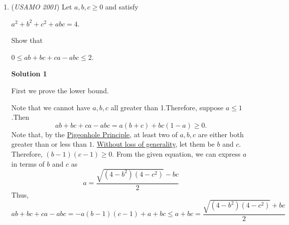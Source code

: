 \begin{enumerate}
 As $Q'$ lies on the incircle and $AD_2$, $Q'=Q$, and our proof is complete.

 


 



\textbf{Solution 4}

We again use Barycentric coordinates. As before, let $A$ be $(1,0,0)$, $B$ be $(0,1,0)$, and $C$ be $(0,0,1)$. Also

 
 \[D_{1}=\left( 0,\frac{s-c}{a},\frac{s-b}{a} \right), D_2=\left(0,\frac{s-b}{a},\frac{s-c}{a}\right), E_2=\left(\frac{s-a}{b},0,\frac{s-c}{b}\right), P=\left(\frac{s-a}{s},\frac{s-b}{s},\frac{s-c}{s}\right).\]

 Now, consider a point $Q'$ for which $AQ'=PD_{2}$. Then working component-vise, we get $Q'+P=A+D_{2}$ from which we can easily get the coordinates of $Q'$ as;

 
 \[Q'=\left(\frac{a}{s},\frac{(s-a)(s-b)}{sa},\frac{(s-a)(s-c)}{sa}\right)\]

 It suffices to show that $Q'=Q$.

 Let $I=\left(\frac{a}{2s},\frac{b}{2s},\frac{c}{2s}\right)$  be the incenter of triangle $ABC$. We claim that $I$ is the midpoint of $Q'D_{1}$. Indeed,

 
 \[\frac{1}{2}\left(0+\frac{a}{s}\right)=\frac{a}{2s}\]

 \[\frac{1}{2}\left(\frac{(s-a)(s-b)}{sa}+\frac{s-c}{a}\right)=\frac{(s-a)(s-b)+s(s-c)}{2sa}=\frac{ab}{2sa}=\frac{b}{2s}\]

 \[\frac{1}{2}\left(\frac{(s-a)(s-c)}{sa}+\frac{s-b}{a}\right)=\frac{c}{2s}\]

 Hence the claim has been proved.

 Since $I$ is the center of $\omega$ and the midpoint of  $Q'D_{1}$, thus $Q'$ is the point diametrically opposite to $D_{1}$, and hence it lies on $\omega$ and closer to $A$ off the 2 points. Thus $Q=Q'$ as desired.

 


	\item (\textit{USAMO 2001}) Let $a, b, c \geq 0$ and satisfy


 $a^2 + b^2 + c^2 + abc = 4.$

 Show that


 $0\leq ab + bc + ca - abc \leq 2.$




\textbf{Solution 1}

First we prove the lower bound.

 Note that we cannot have $a, b, c$ all greater than 1.Therefore, suppose $a \le 1$.Then
 \[ab + bc + ca - abc = a(b + c) + bc(1-a) \ge 0.\]Note that, by the \href{https://artofproblemsolving.com/wiki/index.php?title=Pigeonhole\_Principle}{Pigeonhole Principle}, at least two of $a,b,c$ are either both greater than or less than $1$. \href{https://artofproblemsolving.com/wiki/index.php?title=Without\_loss\_of\_generality}{Without loss of generality}, let them be $b$ and $c$. Therefore, $(b-1)(c-1)\ge 0$. From the given equation, we can express $a$ in terms of $b$ and $c$ as
 \[a=\frac{\sqrt{(4-b^2)(4-c^2)}-bc}{2}\]Thus,
 \[ab + bc + ca - abc = -a (b-1)(c-1)+a+bc \le a+bc = \frac{\sqrt{(4-b^2)(4-c^2)} + bc}{2}\]


\end{enumerate}
